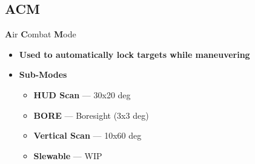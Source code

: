 \subsection{ACM}
\label{subsec:acm}
\begin{tcoloritemize}
    \blueitem[ACM]
    \textbf{A}ir \textbf{C}ombat \textbf{M}ode

    \begin{itemize}
        \item \textbf{Used to automatically lock targets while maneuvering}
        \item \textbf{Sub-Modes}
        \begin{itemize}
            \item \textbf{HUD Scan} --- 30x20 deg 
            \item \textbf{BORE} --- Boresight (3x3 deg)
            \item \textbf{Vertical Scan} --- 10x60 deg
            \item \textbf{Slewable} --- WIP
        \end{itemize}
    \end{itemize}
\end{tcoloritemize}

